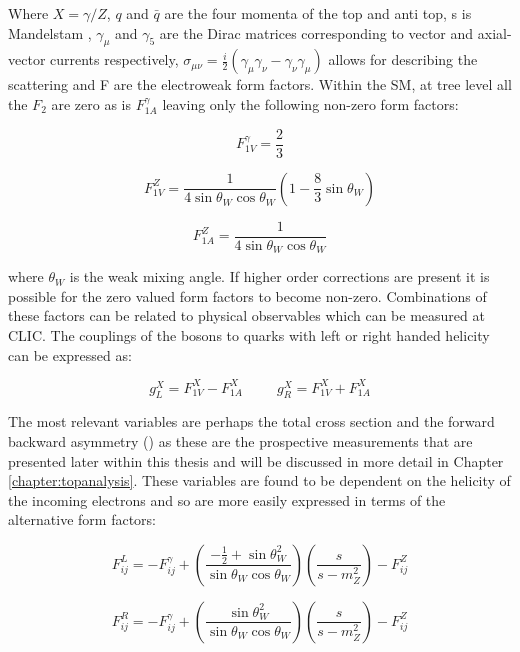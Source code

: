 Where $X=\gamma /Z$, $q$ and $\bar{q}$ are the four momenta of the top and anti top, s is Mandelstam , $\gamma_\mu$ and $\gamma_5$ are the Dirac matrices corresponding to vector and axial-vector currents respectively, $\sigma_{\mu\nu}=\frac{i}{2}(\gamma_\mu \gamma_\nu -\gamma_\nu \gamma_\mu)$ allows for describing the scattering and F are the electroweak form factors. Within the \ac{SM}, at tree level all the $F_2$ are zero as is $F_{1A}^{\gamma}$ leaving only the following non-zero form factors:

\begin{equation}
F_{1V}^{\gamma}=\frac{2}{3}
\end{equation}

\begin{equation}
F_{1V}^{Z}=\frac{1}{4\sin\theta_{W}\cos\theta_{W}}(1-\frac{8}{3}\sin\theta_{W})
\end{equation}

\begin{equation}
F_{1A}^{Z}=\frac{1}{4\sin\theta_{W}\cos\theta_{W}}
\end{equation}

where $\theta_W$ is the weak mixing angle. If higher order corrections are present it is possible for the zero valued form factors to become non-zero. Combinations of these factors can be related to physical observables which can be measured at CLIC. The couplings of the bosons to quarks with left or right handed helicity can be expressed as:

\begin{equation}
g_L^X = F_{1V}^{X} - F_{1A}^{X} ~~~~~~~~~~~ g_R^X = F_{1V}^{X} + F_{1A}^{X}
\end{equation}

The most relevant variables are perhaps the total cross section and the forward backward asymmetry (\afb) as these are the prospective measurements that are presented later within this thesis and will be discussed in more detail in Chapter \ref{chapter:topanalysis}. These variables are found to be dependent on the helicity of the incoming electrons \cite{Schmidt:1995mr} and so are more easily expressed in terms of the alternative form factors:

\begin{equation}
F_{ij}^{L} = -F_{ij}^{\gamma} +(\frac{-\frac{1}{2} +\sin\theta_W^2}{\sin\theta_W\cos\theta_W})(\frac{s}{s-m_Z^2}) -F_{ij}^{Z}
\end{equation}

\begin{equation}
F_{ij}^{R} = -F_{ij}^{\gamma} +(\frac{\sin\theta_W^2}{\sin\theta_W\cos\theta_W})(\frac{s}{s-m_Z^2}) -F_{ij}^{Z}
\end{equation}

